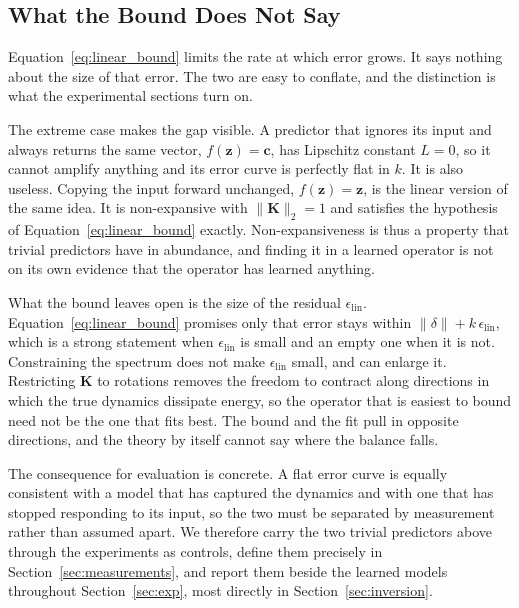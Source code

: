 \documentclass[10pt]{article} %
\newcommand{\K}{\mathbf{K}}
\newcommand{\z}{\bm{z}}
\begin{document}
\subsection{What the Bound Does Not Say}
\label{sec:bound_limits}
Equation~\ref{eq:linear_bound} limits the rate at which error grows. It says nothing about the size of that error. The two are easy to conflate, and the distinction is what the experimental sections turn on.

The extreme case makes the gap visible. A predictor that ignores its input and always returns the same vector, $f(\z) = \mathbf{c}$, has Lipschitz constant $L = 0$, so it cannot amplify anything and its error curve is perfectly flat in $k$. It is also useless. Copying the input forward unchanged, $f(\z) = \z$, is the linear version of the same idea. It is non-expansive with $\|\K\|_2 = 1$ and satisfies the hypothesis of Equation~\ref{eq:linear_bound} exactly. Non-expansiveness is thus a property that trivial predictors have in abundance, and finding it in a learned operator is not on its own evidence that the operator has learned anything.

What the bound leaves open is the size of the residual $\epsilon_\text{lin}$. Equation~\ref{eq:linear_bound} promises only that error stays within $\|\delta\| + k\,\epsilon_\text{lin}$, which is a strong statement when $\epsilon_\text{lin}$ is small and an empty one when it is not. Constraining the spectrum does not make $\epsilon_\text{lin}$ small, and can enlarge it. Restricting $\K$ to rotations removes the freedom to contract along directions in which the true dynamics dissipate energy, so the operator that is easiest to bound need not be the one that fits best. The bound and the fit pull in opposite directions, and the theory by itself cannot say where the balance falls.

The consequence for evaluation is concrete. A flat error curve is equally consistent with a model that has captured the dynamics and with one that has stopped responding to its input, so the two must be separated by measurement rather than assumed apart. We therefore carry the two trivial predictors above through the experiments as controls, define them precisely in Section~\ref{sec:measurements}, and report them beside the learned models throughout Section~\ref{sec:exp}, most directly in Section~\ref{sec:inversion}.
\end{document}
